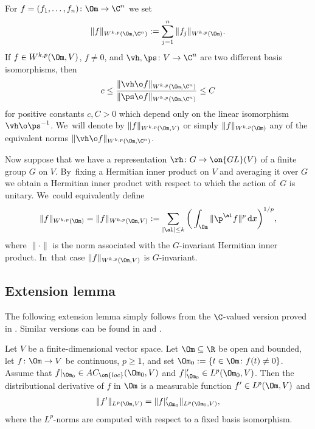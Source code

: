 For $f= (f_1,\dots,f_n) \colon \Om \to \C^n$ we set
\begin{gather} \label{vectorvalued}
 \|f\|_{W^{k,p}(\Om,\C^n)} := \sum_{j=1}^n \|f_j\|_{W^{k,p}(\Om)}.
\end{gather}
If $f \in W^{k,p}(\Om, V)$, $f \ne 0$, and $\vh,\ps \colon V \to \C^n$ are two different basis isomorphisms, then
\begin{gather*}
 c \le \frac{\|\vh \o f\|_{W^{k,p}(\Om,\C^n)}}{\|\ps \o f\|_{W^{k,p}(\Om,\C^n)}} \le C
\end{gather*}
for positive constants $c,C>0$ which depend only on the linear isomorphism $\vh \o \ps^{-1}$. We~will denote by ${\|f\|_{W^{k,p}(\Om,V)}}$ or simply ${\|f\|_{W^{k,p}(\Om)}}$ any of the equivalent norms
$\|\vh \o f\|_{W^{k,p}(\Om,\C^n)}$.


Now suppose that we have a representation $\rh \colon G \to \on{GL}(V)$ of a finite group $G$ on
$V$. By~fixing a Hermitian inner product on $V$ and averaging it over $G$ we obtain a Hermitian inner product
with respect to which the action of~$G$ is unitary. We~could equivalently define
\begin{gather*}
 \|f\|_{W^{k,p}(\Om)} = \|f\|_{W^{k,p}(\Om,V)} := \sum_{|\al| \le k} \bigg(\int_{\Om} \|\p^\al f\|^p \, {\rm d}x\bigg)^{1/p},
 \end{gather*}
 where $\|\cdot\|$ is the norm associated with the $G$-invariant Hermitian inner product. In~that case $\|f\|_{W^{k,p}(\Om,V)}$ is $G$-invariant.


\subsection{Extension lemma}


The following extension lemma simply follows from the $\C$-valued version proved in \cite{ParusinskiRainer15}.
Similar versions can be found in \cite[Lemma 2.1]{ParusinskiRainerAC}
and \cite[Lemma 3.2]{GhisiGobbino13}.

\begin{Lemma} \label{lem:extend}
 Let $V$ be a finite-dimensional vector space.
 Let $\Om \subseteq \R$ be open and bounded, let $f \colon \Om \to V$ be continuous, $p \ge 1$,
 and set $\Om_0 := \{t \in \Om \colon f(t) \ne 0\}$.
 Assume that $f|_{\Om_0} \in AC_{\on{loc}}(\Om_0,V)$ and $f|_{\Om_0}' \in L^p(\Om_0,V)$.
 Then the distributional derivative of $f$ in $\Om$ is a measurable function $f' \in L^p(\Om,V)$ and
 \begin{gather*} %
 \|f'\|_{L^p(\Om,V)} = \|f|_{\Om_0}'\|_{L^p(\Om_0,V)},
 \end{gather*}
 where the $L^p$-norms are computed with respect to a fixed basis isomorphism.
\end{Lemma}

